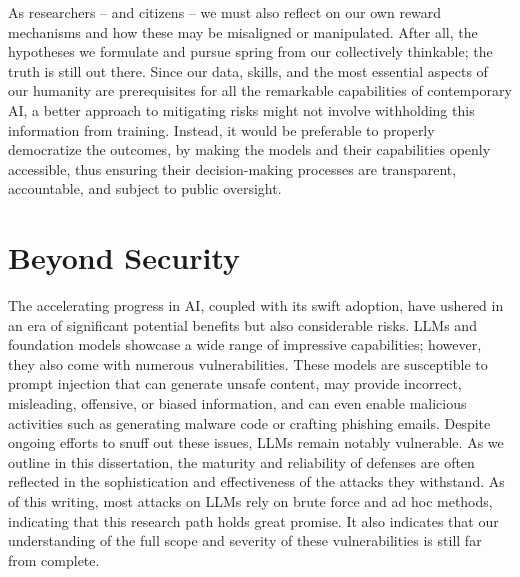 As researchers -- and citizens -- we must also reflect on our own reward mechanisms and how these may be misaligned or manipulated.
After all, the hypotheses we formulate and pursue spring from our collectively thinkable; the truth is still out there.
Since our data, skills, and the most essential aspects of our humanity are prerequisites for all the remarkable capabilities of contemporary \gls{AI}, a better approach to mitigating risks might not involve withholding this information from training.
Instead, it would be preferable to properly democratize the outcomes, by making the models and their capabilities openly accessible, thus ensuring their decision-making processes are transparent, accountable, and subject to public oversight.

\section{Beyond Security}

The accelerating progress in \gls{AI}, coupled with its swift adoption, have ushered in an era of significant potential benefits but also considerable risks.
\gls{LLM}s and foundation models showcase a wide range of impressive capabilities; however, they also come with numerous vulnerabilities.
These models are susceptible to prompt injection that can generate unsafe content, may provide incorrect, misleading, offensive, or biased information, and can even enable malicious activities such as generating malware code or crafting phishing emails.
Despite ongoing efforts to snuff out these issues, LLMs remain notably vulnerable.
As we outline in this dissertation, the maturity and reliability of defenses are often reflected in the sophistication and effectiveness of the attacks they withstand.
As of this writing, most attacks on LLMs rely on brute force and ad hoc methods, indicating that this research path holds great promise.
It also indicates that our understanding of the full scope and severity of these vulnerabilities is still far from complete.

